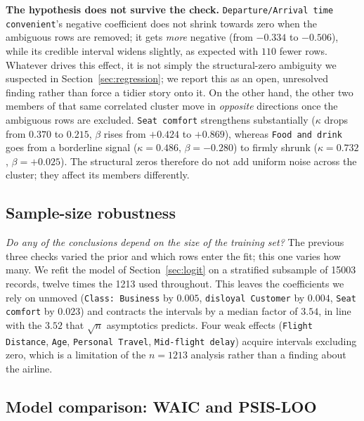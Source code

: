 \noindent\textbf{The hypothesis does not survive the check.}
\texttt{Departure/Arrival time convenient}'s negative coefficient does
not shrink towards zero when the ambiguous rows are removed; it gets
\emph{more} negative (from $-0.334$ to $-0.506$), while its credible
interval widens slightly, as expected with $110$ fewer rows. Whatever
drives this effect, it is not
simply the structural-zero ambiguity we suspected in Section~\ref{sec:regression}; we
report this as an open, unresolved finding rather than force a tidier
story onto it. On the other hand, the other two members of that same correlated
cluster move in \emph{opposite} directions once the ambiguous rows are
excluded. \texttt{Seat comfort} strengthens substantially ($\kappa$
drops from $0.370$ to $0.215$, $\beta$ rises from $+0.424$ to
$+0.869$), whereas \texttt{Food and drink} goes from a borderline
signal ($\kappa = 0.486$, $\beta = -0.280$) to firmly shrunk
($\kappa = 0.732$, $\beta = +0.025$). The structural zeros therefore
do not add uniform noise across the cluster; they affect its members
differently.


\subsection{Sample-size robustness}
\label{sec:sens-samplesize}
\emph{Do any of the conclusions depend on the size of the training set?}
The previous three checks varied the prior and which rows enter the fit; this
one varies how many. We refit the model of Section~\ref{sec:logit} on a
stratified subsample of \num{15003} records, twelve times the \num{1213} used
throughout. This leaves the coefficients we rely on
unmoved (\texttt{Class: Business} by $0.005$, \texttt{disloyal
Customer} by $0.004$, \texttt{Seat comfort} by $0.023$) and contracts
the intervals by a median factor of $3.54$, in line with the $3.52$ that
$\sqrt{n}$ asymptotics predicts. Four weak effects
(\texttt{Flight Distance}, \texttt{Age}, \texttt{Personal Travel},
\texttt{Mid-flight delay}) acquire intervals excluding zero, which is a limitation of the
$n = 1213$ analysis rather than a finding about the airline.

\subsection{Model comparison: WAIC and PSIS-LOO}
\label{WPSIS}

